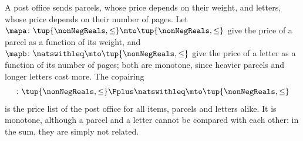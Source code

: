 \begin{example}[Postage]
    \label{exa:monotone-copairing-postage}
    A post office sends parcels, whose price depends on their weight, and letters, whose price depends on their number of pages.
    Let $\mapa \colon \tup{\nonNegReals, \leq} \mto \tup{\nonNegReals, \leq}$ give the price of a parcel as a function of its weight, and $\mapb \colon \natswithleq \mto \tup{\nonNegReals, \leq}$ give the price of a letter as a function of its number of pages; both are monotone, since heavier parcels and longer letters cost more.
    The copairing
    \begin{equation}
        [\mapa, \mapb] \colon \tup{\nonNegReals, \leq} \Pplus \natswithleq \mto \tup{\nonNegReals, \leq}
    \end{equation}
    is the price list of the post office for all items, parcels and letters alike.
    It is monotone, although a parcel and a letter cannot be compared with each other: in the sum, they are simply not related.
\end{example}
